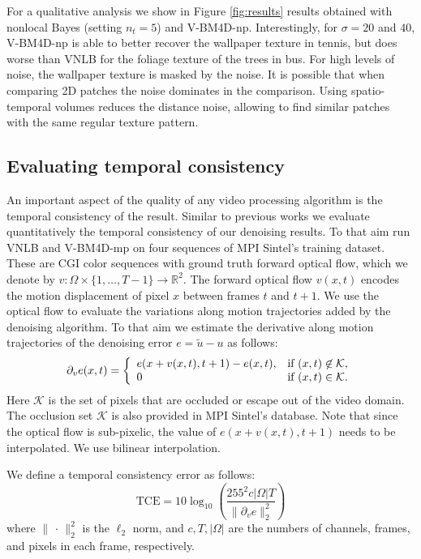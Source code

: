 \documentclass[10pt, journal, twocolumn, final, a4paper]{IEEEtran}
\begin{document}
For a qualitative analysis we show in Figure \ref{fig:results} results obtained
with nonlocal Bayes (setting $n_t = 5$) and V-BM4D-np. Interestingly, for $\sigma = 20$
and $40$, V-BM4D-np is able to better recover the wallpaper texture in tennis,
but does worse than VNLB for the foliage texture of the trees in bus. 
For high levels of noise, the wallpaper texture is masked by the noise. 
It is possible that when comparing 2D patches the noise dominates in the
comparison. Using spatio-temporal volumes reduces the distance noise,
allowing to find similar patches with the same regular texture pattern.

\subsection{Evaluating temporal consistency}

An important aspect of the quality of any video processing algorithm is the 
temporal consistency of the result. Similar to previous works \cite{Liu2010, Sutour2014}
we evaluate quantitatively the temporal consistency of our denoising results.
To that aim run VNLB and V-BM4D-mp on four sequences of MPI Sintel's training
dataset. These are CGI color sequences with ground truth forward optical flow, which we
denote by $v:\Omega\times\{1,\dots,T-1\}\rightarrow \mathds R^2$. 
The forward optical flow $v(x,t)$ encodes the motion displacement of pixel $x$
between frames $t$ and $t +1$.
We use the optical flow to evaluate the variations along motion trajectories
added by the denoising algorithm. To that aim we estimate the derivative along
motion trajectories of the denoising error $e = \widetilde u - u$ as follows:
\[\partial_v e(x,t) =
\left\{
\begin{array}{l l}
	e(x + v(x,t), t+1) - e(x,t), & \text{if } (x,t)\not\in \mathcal{K},\\
	0 & \text{if } (x,t)\in \mathcal{K}.
\end{array}
\right.\]
Here $\mathcal K$ is the set of pixels that are occluded or escape out of the video
domain. The occlusion set $\mathcal K$ is also provided in MPI Sintel's database.
Note that since the optical flow is sub-pixelic, the value of $e(x + v(x,t),t+1)$
needs to be interpolated. We use bilinear interpolation.

We define a temporal consistency error as follows:
\[\text{TCE} = 10 \log_{10}\left(\frac{255^2 c|\Omega|T}{\|\partial_v e\|_2^2}\right)\]
where $\|\,\cdot\,\|_2^2$ is the $\ell_2$ norm, and $c, T, |\Omega|$ are the numbers
of channels, frames, and pixels in each frame, respectively.
\end{document}
